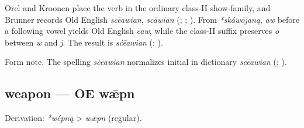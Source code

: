 \documentclass[
  british,
  a4paper,
]{article}
\begin{document}
Orel and Kroonen place the verb in the ordinary class-II show-family,
and Brunner records Old English \emph{scēawian}, \emph{scāwian}
(;
;
). From
\emph{*skáwōjaną}, \emph{aw} before a following vowel yields Old English
\emph{ēaw}, while the class-II suffix preserves \emph{ō} between
\emph{w} and \emph{j}. The result is \emph{sċēawian}
(;
).

Form note. The spelling \emph{sċēawian} normalizes initial in dictionary
\emph{scēawian} (;
).

\subsection{weapon --- OE wǣpn}\label{weapon-oe-wux1e3pn}

Derivation: \emph{*wḗpną} \textgreater{} \emph{wǣpn} (regular).

\begingroup
\setlength{\fboxsep}{6pt}
\end{document}
